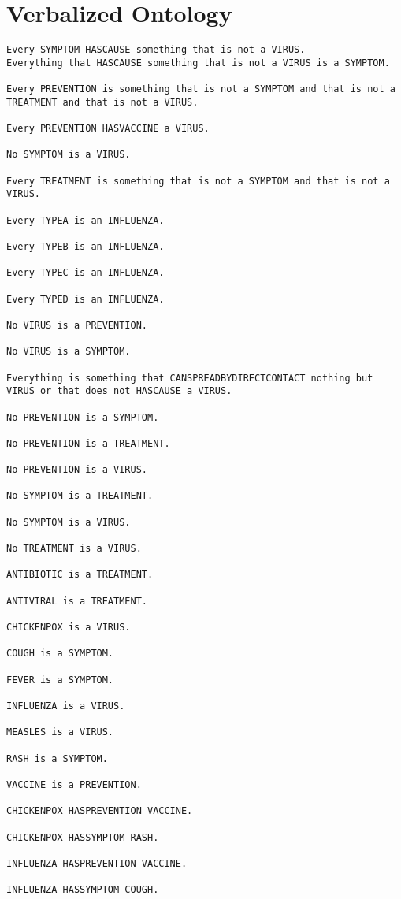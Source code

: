 \documentclass[a4paper,12pt]{report}
\begin{document}
\section{Verbalized Ontology}
\lstset{style=mystyle}
\begin{lstlisting}
Every SYMPTOM HASCAUSE something that is not a VIRUS.
Everything that HASCAUSE something that is not a VIRUS is a SYMPTOM.

Every PREVENTION is something that is not a SYMPTOM and that is not a TREATMENT and that is not a VIRUS.

Every PREVENTION HASVACCINE a VIRUS.

No SYMPTOM is a VIRUS.

Every TREATMENT is something that is not a SYMPTOM and that is not a VIRUS.

Every TYPEA is an INFLUENZA.

Every TYPEB is an INFLUENZA.

Every TYPEC is an INFLUENZA.

Every TYPED is an INFLUENZA.

No VIRUS is a PREVENTION.

No VIRUS is a SYMPTOM.

Everything is something that CANSPREADBYDIRECTCONTACT nothing but VIRUS or that does not HASCAUSE a VIRUS.

No PREVENTION is a SYMPTOM.

No PREVENTION is a TREATMENT.

No PREVENTION is a VIRUS.

No SYMPTOM is a TREATMENT.

No SYMPTOM is a VIRUS.

No TREATMENT is a VIRUS.

ANTIBIOTIC is a TREATMENT.

ANTIVIRAL is a TREATMENT.

CHICKENPOX is a VIRUS.

COUGH is a SYMPTOM.

FEVER is a SYMPTOM.

INFLUENZA is a VIRUS.

MEASLES is a VIRUS.

RASH is a SYMPTOM.

VACCINE is a PREVENTION.

CHICKENPOX HASPREVENTION VACCINE.

CHICKENPOX HASSYMPTOM RASH.

INFLUENZA HASPREVENTION VACCINE.

INFLUENZA HASSYMPTOM COUGH.


\end{lstlisting}
\end{document}
